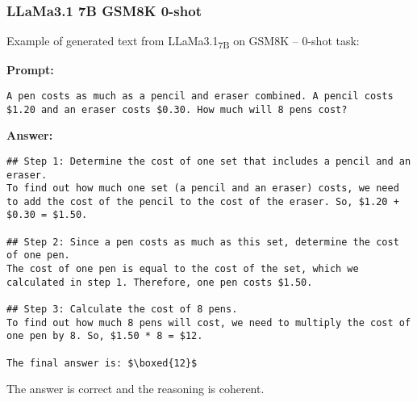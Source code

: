 \subsubsection*{LLaMa3.1 7B GSM8K 0-shot}
\noindent Example of generated text from LLaMa3.1\textsubscript{7B} on GSM8K -- 0-shot task:
\begin{displayquote}
	\textbf{Prompt:}
	\begin{Verbatim}[fontsize=\small,breaklines]
A pen costs as much as a pencil and eraser combined. A pencil costs $1.20 and an eraser costs $0.30. How much will 8 pens cost?
	\end{Verbatim}
	\textbf{Answer:}
	\begin{Verbatim}[fontsize=\small,breaklines]
## Step 1: Determine the cost of one set that includes a pencil and an eraser.
To find out how much one set (a pencil and an eraser) costs, we need to add the cost of the pencil to the cost of the eraser. So, $1.20 + $0.30 = $1.50.

## Step 2: Since a pen costs as much as this set, determine the cost of one pen.
The cost of one pen is equal to the cost of the set, which we calculated in step 1. Therefore, one pen costs $1.50.

## Step 3: Calculate the cost of 8 pens.
To find out how much 8 pens will cost, we need to multiply the cost of one pen by 8. So, $1.50 * 8 = $12.

The final answer is: $\boxed{12}$
	\end{Verbatim}
\end{displayquote}
The answer is correct and the reasoning is coherent.
